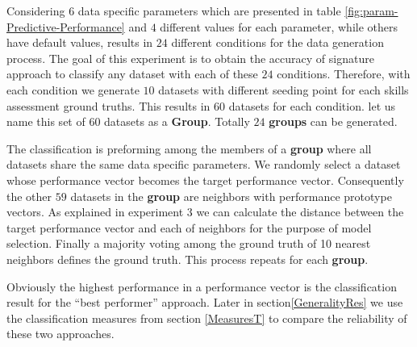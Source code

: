 Considering $6$ data specific parameters which are presented in table \ref{fig:param-Predictive-Performance} and $4$ different values for each parameter, while others have default values, results in $24$ different conditions for the data generation process. The goal of this experiment is to obtain the accuracy of signature approach to classify any dataset with each of these $24$ conditions. Therefore, with each condition we generate $10$ datasets with different seeding point for each skills assessment ground truths. This results in $60$ datasets for each condition. let us name this set of $60$ datasets as a \textbf{Group}. Totally $24$ \textbf{groups} can be generated.

The classification is preforming among the members of a \textbf{group} where all datasets share the same data specific parameters. We randomly select a dataset whose performance vector becomes the target performance vector. Consequently the other $59$ datasets in the \textbf{group} are neighbors with performance prototype vectors. As explained in experiment 3 we can calculate the distance between the target performance vector and each of neighbors for the purpose of model selection. Finally a majority voting among the ground truth of 10 nearest neighbors defines the ground truth. This process repeats for each \textbf{group}.

Obviously the highest performance in a performance vector is the classification result for the ``best performer'' approach. Later in section\ref{GeneralityRes} we use the classification measures from section \ref{MeasuresT} to compare the reliability of these two approaches.
